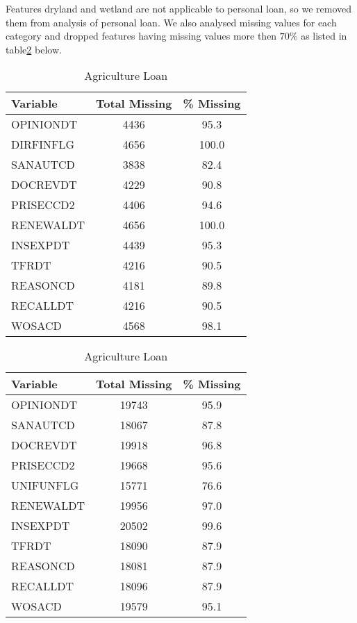 \documentclass[a4paper]{article}
\begin{document}
Features dryland and wetland are not applicable to personal loan, so we removed them from analysis of personal loan.  We also analysed missing values for each category and dropped features having missing values more then $70\%$ as listed in table\ref{tab:missing-values} below. 

\begin{table}[H]	
	\caption{\% of Missing Values for Personal Loan and Agriculture Loan}
	\label{tab:missing-values}
	\begin{subtable}{0.4\textwidth}
		\centering
		\caption{Personal Loan}
		\begin{tabular}{|lcc|}
			\hline
			Variable   & Total Missing & \% Missing \\
			\hline
			OPINIONDT  & 4436          & 95.3 \\
			DIRFINFLG  & 4656          & 100.0 \\
			SANAUTCD   & 3838          & 82.4 \\
			DOCREVDT   & 4229          & 90.8 \\
			PRISECCD2  & 4406          & 94.6 \\
			RENEWALDT  & 4656          & 100.0 \\
			INSEXPDT   & 4439          & 95.3 \\
			TFRDT      & 4216          & 90.5 \\
			REASONCD   & 4181          & 89.8 \\
			RECALLDT   & 4216          & 90.5 \\
			WOSACD     & 4568          & 98.1 \\
			\hline
		\end{tabular}
	\end{subtable}%
	\begin{subtable}{0.7\textwidth}
		\centering
		\caption{Agriculture Loan}
		\begin{tabular}{|lcc|}
			\hline
			Variable   & Total Missing & \% Missing \\
			\hline
			OPINIONDT  & 19743         & 95.9 \\
			SANAUTCD   & 18067         & 87.8 \\
			DOCREVDT   & 19918         & 96.8 \\
			PRISECCD2  & 19668         & 95.6 \\
			UNIFUNFLG  & 15771         & 76.6 \\
			RENEWALDT  & 19956         & 97.0 \\
			INSEXPDT   & 20502         & 99.6 \\
			TFRDT      & 18090         & 87.9 \\
			REASONCD   & 18081         & 87.9 \\
			RECALLDT   & 18096         & 87.9 \\
			WOSACD     & 19579         & 95.1 \\
			\hline
		\end{tabular}
	\end{subtable}
	

\end{table}
\end{document}

